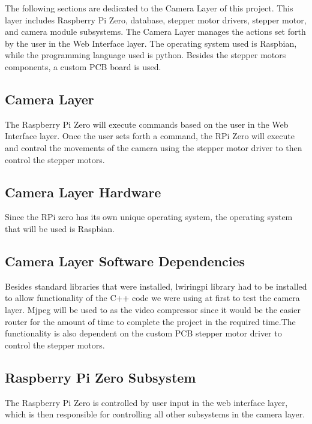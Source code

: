 The following sections are dedicated to the Camera Layer of this project. This layer includes Raspberry Pi Zero, database, stepper motor drivers, stepper motor, and camera module subsystems. The Camera Layer manages the actions set forth by the user in the Web Interface layer. The operating system used is Raspbian, while the programming language used is python. Besides the stepper motors components, a custom PCB board is used.

\subsection{Camera Layer}
The Raspberry Pi Zero will execute commands based on the user in the Web Interface layer. Once the user sets forth a command, the RPi Zero will execute and control the movements of the camera using the stepper motor driver to then control the stepper motors.

\subsection{Camera Layer Hardware}
Since the RPi zero has its own unique operating system, the operating system that will be used is Raspbian. 

\subsection{Camera Layer Software Dependencies}
Besides standard libraries that were installed, lwiringpi library had to be installed to allow functionality of the C++ code we were using at first to test the camera layer. Mjpeg will be used to as the video compressor since it would be the easier router for the amount of time to complete the project in the required time.The functionality is also dependent on the custom PCB stepper motor driver to control the stepper motors.


\subsection{Raspberry Pi Zero Subsystem}
The Raspberry Pi Zero is controlled by user input in the web interface layer, which is then responsible for controlling all other subsystems in the camera layer.

